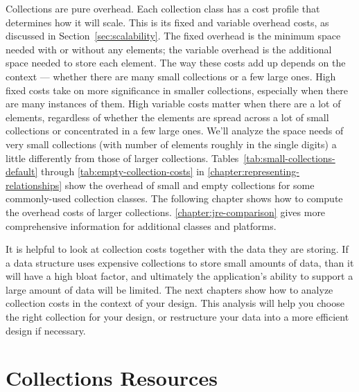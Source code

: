 Collections are pure overhead. Each collection class has a cost
profile that determines how it will scale. This is its fixed
and variable overhead costs, as discussed in Section~\ref{sec:scalability}. 
The fixed overhead is the minimum space needed with or
without any elements; the variable overhead is the additional space needed to
store each element. The way these costs add up
depends on the context ---
whether there are many small collections or a few large ones. 
High fixed costs take on more significance in smaller collections,
especially when there are many instances of them. High variable costs matter
when there are a lot of elements, regardless of whether the elements are spread across
a lot of small collections or concentrated in a few large ones.
We'll analyze the space needs of very small collections (with number of elements
roughly in the single digits) a little differently from those of larger
collections.
Tables~\ref{tab:small-collections-default} through \ref{tab:empty-collection-costs} in
\autoref{chapter:representing-relationships} show the overhead of small and empty collections for some commonly-used
collection classes. The following chapter shows
how to compute the overhead costs of larger collections.
\autoref{chapter:jre-comparison} gives more comprehensive information for
additional classes and platforms.





It is helpful to look at collection costs 
together with the data they are storing. If a data structure uses expensive collections
to store small amounts of data, than it
will have a high bloat factor, and ultimately the application's ability to
support a large amount of data will be limited. The next chapters show
how to analyze collection costs in the context of your design.
This analysis will help you choose the right collection for your design, or
restructure your data into a more efficient design if necessary.


\section{Collections Resources}

